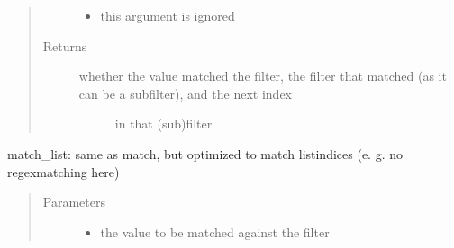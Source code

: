 \documentclass[a4paper,10pt,english]{sphinxmanual}
\begin{document}
\begin{fulllineitems}
\begin{fulllineitems}
\begin{quote}
\begin{description}
\begin{itemize}
\item {}
\sphinxAtStartPar
\sphinxstyleliteralstrong{\sphinxupquote{\_}} \textendash{} this argument is ignored

\end{itemize}

\item[{Returns}] \leavevmode
\sphinxAtStartPar
\begin{description}
\item[{whether the value matched the filter, the filter that matched (as it can be a subfilter), and the next index}] \leavevmode
\sphinxAtStartPar
in that (sub)filter

\end{description}


\end{description}\end{quote}

\end{fulllineitems}


\begin{fulllineitems}
\label{\detokenize{fagus.filters:fagus.filters.KFil.match_list}}
\pysigstartsignatures
{}
\pysigstopsignatures
\sphinxAtStartPar
match\_list: same as match, but optimized to match list\sphinxhyphen{}indices (e. g. no regex\sphinxhyphen{}matching here)
\begin{quote}\begin{description}
\item[{Parameters}] \leavevmode\begin{itemize}
\item {}
\sphinxAtStartPar
{} \textendash{} the value to be matched against the filter


\end{itemize}
\end{description}
\end{quote}
\end{fulllineitems}
\end{fulllineitems}
\end{document}
